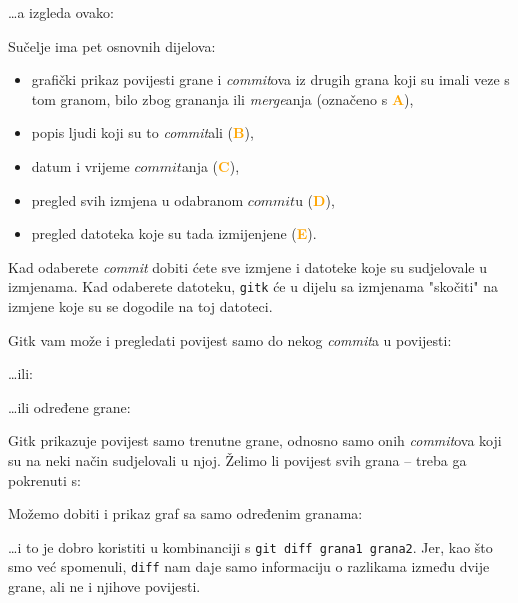 
\dots{}a izgleda ovako:


Sučelje ima pet osnovnih dijelova:

\begin{itemize}
	\item grafički prikaz povijesti grane i \emph{commit}ova iz drugih grana koji su imali veze s tom granom, bilo zbog grananja ili \emph{merge}anja (označeno s \textcolor{orange}{\textbf{A}}),
	\item popis ljudi koji su to \emph{commit}ali (\textcolor{orange}{\textbf{B}}),
	\item datum i vrijeme $commit$anja (\textcolor{orange}{\textbf{C}}), 
	\item pregled svih izmjena u odabranom $commit$u (\textcolor{orange}{\textbf{D}}),
	\item pregled datoteka koje su tada izmijenjene (\textcolor{orange}{\textbf{E}}).
\end{itemize}

Kad odaberete \emph{commit} dobiti ćete sve izmjene i datoteke koje su sudjelovale u izmjenama.
Kad odaberete datoteku, \verb+gitk+ će u dijelu sa izmjenama "skočiti" na izmjene koje su se dogodile na toj datoteci.

Gitk vam može i pregledati povijest samo do nekog \emph{commit}a u povijesti:


\dots{}ili:


\dots{}ili određene grane:


Gitk prikazuje povijest samo trenutne grane, odnosno samo onih \emph{commit}ova koji su na neki način sudjelovali u njoj.
Želimo li povijest svih grana -- treba ga pokrenuti s:


Možemo dobiti i prikaz graf sa samo određenim granama:


\dots{}i to je dobro koristiti u kombinanciji s \verb+git diff grana1 grana2+.
Jer, kao što smo već spomenuli, \verb+diff+ nam daje samo informaciju o razlikama između dvije grane, ali ne i njihove povijesti.

